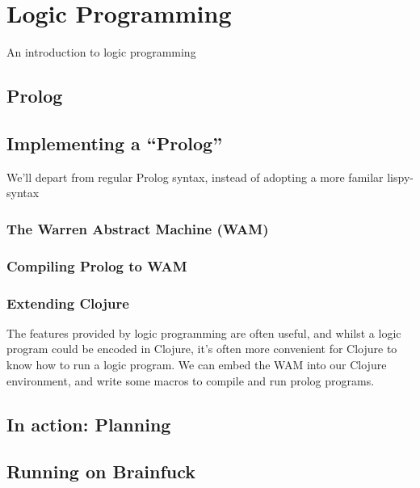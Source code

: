 \chapter{Logic Programming}

An introduction to logic programming

\section{Prolog}

\section{Implementing a ``Prolog''}

We'll depart from regular Prolog syntax, instead of adopting a more
familar lispy-syntax

\subsection{The Warren Abstract Machine (WAM)}

\subsection{Compiling Prolog to WAM}

\subsection{Extending Clojure}

The features provided by logic programming are often useful, and
whilst a logic program could be encoded in Clojure, it's often more
convenient for Clojure to know how to run a logic program. We can
embed the WAM into our Clojure environment, and write some macros to
compile and run prolog programs.

\section{In action: Planning}

\section{Running on Brainfuck}

